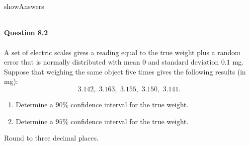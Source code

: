 \documentclass{article}
\begin{document}
~\\~\\
\begin{maybePrint}{showAnswers}
~\\~\\
\end{maybePrint}
%
%
{\bf Question 8.2}
~\\~\\
A set of electric scales gives a reading equal to the true weight plus a random error that is normally distributed with mean $0$ and standard deviation $0.1$ mg. Suppose that weighing the same object five times gives the following results (in mg): 
$$3.142,\,\, 3.163,\,\, 3.155,\,\, 3.150,\,\, 3.141.$$
\begin{enumerate}
\item[(a)] Determine a $90\%$  confidence interval for the true weight.
\item[(b)] Determine a $95\%$  confidence interval for the true weight.
\end{enumerate}
Round to three decimal places. 
~\\~\\
\end{document}
